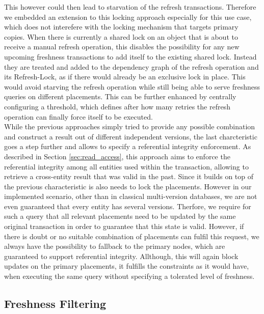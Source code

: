 This however could then lead to starvation of the refresh transactions. 
Therefore we embedded an extension to this locking approach especially for this use case, which does not interefere with 
the locking mechanism that targets primary copies. When there is currently a shared lock on an object that is about to receive a manual refresh operation, 
this disables the possibility for any new upcoming freshness transactions to add itself to the existing shared lock. Instead they are treated and added to the dependency graph 
of the refresh operation and its Refresh-Lock, as if there would already be an exclusive lock in place. 
This would avoid starving the refresh operation while still being able to serve freshness queries on different placements.
This can be further enhanced by centrally configuring a threshold, which defines after how many retries the refresh operation can finally force itself 
to be executed.\\
While the previous approaches simply tried to provide any possible combination
and construct a result out of different independent versions, the last charcteristic goes a step further and allows to specify a referential integrity enforcement. 
As described in Section \ref{sec:read_access}, this approach aims to enforce the referential integrity among all entities used within the transaction, 
allowing to retrieve a cross-entity result that was valid in the past. Since it builds on top of the previous characteristic is also needs to lock the placements. 
However in our implemented scenario, other than in classical multi-version databases, we are not even guaranteed that every entity has several versions. 
Therfore, we require for such a query that all relevant placements need to be updated by the same original transaction in order to guarantee that this state is valid.
However, if there is doubt or no suitable combination of placements can fulfil this request,
we always have the possibility to fallback to the primary nodes, which are guaranteed to support referential integrity.
Allthough, this will again block updates on the primary placements, it fulfills the constraints as it would have, when executing the same query without specifying a tolerated level of freshness.






\subsection{Freshness Filtering}
\label{sec:fresh_filter} 

